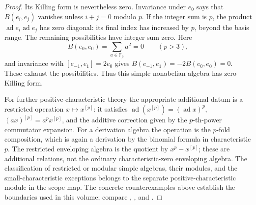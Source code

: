 \begin{proof}
Its Killing form is nevertheless zero.
Invariance under \(e_0\) says that \(B(e_i,e_j)\)
vanishes unless \(i+j=0\) modulo \(p\).
If the integer sum is \(p\), the product
\(\operatorname{ad}e_i\operatorname{ad}e_j\)
has zero diagonal: its final index has increased
by \(p\), beyond the basis range. The remaining
possibilities have integer sum zero. Here
\[
 B(e_0,e_0)=\sum_{a\in\mathbb F_p}a^2=0
 \qquad(p>3),
\]
and invariance with \([e_{-1},e_1]=2e_0\) gives
\(B(e_{-1},e_1)=-2B(e_0,e_0)=0\).
These exhaust the possibilities. Thus this simple
nonabelian algebra has zero Killing form.

For further positive-characteristic theory the appropriate
additional datum is a restricted operation \(x\mapsto x^{[p]}\):
it satisfies
\(\operatorname{ad}(x^{[p]})=(\operatorname{ad}x)^p\),
\((a x)^{[p]}=a^p x^{[p]}\), and the additive correction
given by the \(p\)-th-power commutator expansion.
For a derivation algebra the operation is the \(p\)-fold
composition, which is again a derivation by the binomial
formula in characteristic \(p\).
The restricted enveloping algebra is the quotient by
\(x^p-x^{[p]}\); these are additional relations, not the
ordinary characteristic-zero enveloping algebra.
The classification of restricted or modular simple
algebras, their modules, and the small-characteristic
exceptions belongs to the separate positive-characteristic
module in the scope map. The concrete counterexamples
above establish the boundaries used in this volume;
compare \cite[Section 15.4]{etingof},
\cite[Section 1]{premet}, and \cite[Sections A.1--A.2]{jantzen}.
\end{proof}
